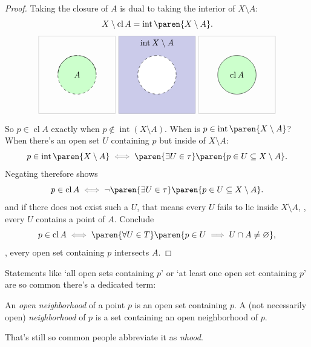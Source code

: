 \documentclass[a5paper]{scrbook}
\let\oldimplies\implies
\def\implies{\color{gray}\oldimplies\color{black}}
\let\oldiff\iff
\def\iff{\color{gray}\oldiff\color{black}}
\DeclareMathOperator{\interior}{int}
\DeclareMathOperator{\cl}{cl}
\begin{document}
  \begin{proof}
    Taking the  closure of \(A\) is dual to taking the interior of \(X\setminus A\):
    \[
      X\setminus \cl A = \interior\paren{X\setminus A}.
    \]
    \[
      \begin{tikzpicture}[scale=.8]
        \draw[lightgray] (-2,-2) rectangle (2,2);
        \filldraw[dashed,fill=green!20] (0,0) circle (1);
        \draw (0,0) coordinate [label=center:\(A\)];
        {\clip (-1,0) rectangle (1,1);
          \draw (0,0) circle (1);
        }
      \end{tikzpicture}
      \ 
      \begin{tikzpicture}[scale=.8]
        \draw[lightgray] (-2,-2) rectangle (2,2);
        \fill[blue!60!black,opacity=.2] (-2,-2) rectangle (2,2);
        \draw (0,2) coordinate [label=below:\(\interior X\setminus A\)];
        \filldraw[dashed,fill=white] (0,0) circle (1);
      \end{tikzpicture}
      \ 
      \begin{tikzpicture}[scale=.8]
        \draw[lightgray] (-2,-2) rectangle (2,2);
        \filldraw[fill=green!20] (0,0) circle (1);
        \draw (0,0) coordinate[label=center:\(\cl A\)];
      \end{tikzpicture}
    \]
    So \(p\in\cl A\) exactly when \(p\notin \interior(X\setminus A)\).  When is \(p\in \interior\paren{X\setminus A}\)? When there's an open set \(U\) containing \(p\) but inside of \(X\setminus A\):
    \[
      p\in\interior\paren{X\setminus A} \iff \paren{\exists U\in\tau }\paren{ p\in U\subseteq X\setminus A}. 
    \]
    Negating therefore shows
    \[
      p\in\cl A \iff \neg\paren{\exists U\in\tau }\paren{ p\in U\subseteq X\setminus A}. 
    \]
    and if there does not exist such a \(U\), that means every \(U\) fails to lie inside \(X\setminus A\), \ie, every \(U\) contains a point of \(A\). Conclude
    \[
      p\in\cl A \iff \paren{\forall U\in T} \paren{p\in U \implies U \cap A \neq \emptyset}, 
    \]
    \ie, every open set containing \(p\) intersects \(A\). 
  \end{proof}
  Statements like `all open sets containing \(p\)' or `at least one open set containing \(p\)' are so common there's a dedicated term:
  \begin{defn}[Neighborhood]
    An \emph{open neighborhood} of a point \(p\) is an open set containing \(p\). A  (not necessarily open) \emph{neighborhood} of \(p\) is a set containing an open neighborhood of \(p\). 

    That's still so common people abbreviate it as \emph{nhood}. 
  \end{defn}
\end{document}
